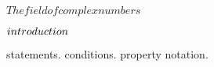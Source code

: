 \documentclass[../Main/main]{subfiles}
\begin{document}
\unit{ $ The field of complex numbers $ }
{
	\introduction
	{ 
		$introduction\\$ 
	}

	{
		{
			statements.
		}
		{
			conditions.
		}
		\denote
		{
			property \as notation.
		}
	}
	
	
	
	
	
	

}
\end{document}
